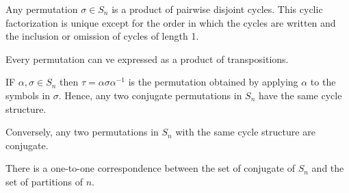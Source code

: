 \begin{teo}
    Any permutation $\sigma\in S_n$ is a product of pairwise disjoint cycles. This cyclic factorization is unique except for the order in which the cycles are written and the inclusion or omission of cycles of length 1.
\end{teo}
\begin{coro}
    Every permutation can ve expressed as a product of transpositions.
\end{coro}
\begin{teo}
    IF $\alpha, \sigma \in S_n$ then $\tau =\alpha\sigma \alpha^{-1}$ is the permutation obtained by applying $\alpha$ to the symbols in $\sigma$. Hence, any two conjugate permutations in $S_n$ have the same cycle structure.
    
    Conversely, any two permutations in $S_n$ with the same cycle structure are conjugate.
\end{teo}
\begin{coro}
    There is a one-to-one correspondence between the set of conjugate of $S_n$ and the set of partitions of $n$.
\end{coro}